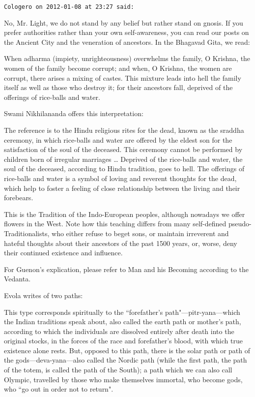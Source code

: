 \begin{footnotesize}
\begin{sffamily}
\hfill

\texttt{Cologero on 2012-01-08 at 23:27 said: }

No, Mr. Light, we do not stand by any belief but rather stand on gnosis. If you prefer authorities rather than your own self-awareness, you can read our posts on the Ancient City and the veneration of ancestors. In the Bhagavad Gita, we read:

\begin{quotex}
When adharma (impiety, unrighteousness) overwhelms the family, O Krishna, the women of the family become corrupt; and when, O Krishna, the women are corrupt, there arises a mixing of castes. This mixture leads into hell the family itself as well as those who destroy it; for their ancestors fall, deprived of the offerings of rice-balls and water. 

\end{quotex}
Swami Nikhilananda offers this interpretation:

\begin{quotex}
The reference is to the Hindu religious rites for the dead, known as the sraddha ceremony, in which rice-balls and water are offered by the eldest son for the satisfaction of the soul of the deceased. This ceremony cannot be performed by children born of irregular marriages … Deprived of the rice-balls and water, the soul of the deceased, according to Hindu tradition, goes to hell. The offerings of rice-balls and water is a symbol of loving and reverent thoughts for the dead, which help to foster a feeling of close relationship between the living and their forebears. 

\end{quotex}
This is the Tradition of the Indo-European peoples, although nowadays we offer flowers in the West. Note how this teaching differs from many self-defined pseudo-Traditionalists, who either refuse to beget sons, or maintain irreverent and hateful thoughts about their ancestors of the past 1500 years, or, worse, deny their continued existence and influence.

For Guenon's explication, please refer to Man and his Becoming according to the Vedanta.

Evola writes of two paths:

\begin{quotex}
This type corresponds spiritually to the ``forefather's path"—pitr-yana—which the Indian traditions speak about, also called the earth path or mother's path, according to which the individuals are dissolved entirely after death into the original stocks, in the forces of the race and forefather's blood, with which true existence alone rests. But, opposed to this path, there is the solar path or path of the gods—deva-yana—also called the Nordic path (while the first path, the path of the totem, is called the path of the South); a path which we can also call Olympic, travelled by those who make themselves immortal, who become gods, who ``go out in order not to return". 


\end{quotex}
\end{sffamily}
\end{footnotesize}
